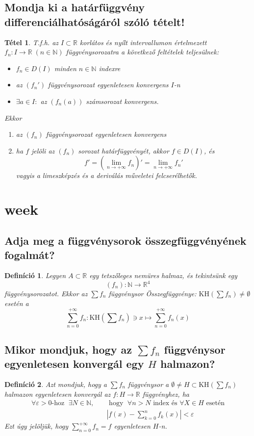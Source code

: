 \documentclass[12pt,a4paper]{article}
\newcommand{\R}{\mathbb{R}}
\newcommand{\N}{\mathbb{N}}
\newcommand{\fn}{f_n}
\newcommand{\KH}[1]{\text{KH}(#1)}
\newcommand{\bb}[1]{\left( #1 \right)}
\newcommand{\abs}[1]{\left| #1 \right|}
\newtheorem{tet}{Tétel}[section]
\newtheorem{defi}{Definíció}[section]
\begin{document}
\subsection{Mondja ki a határfüggvény differenciálhatóságáról szóló tételt!}
\begin{tet}
T.f.h. az $I \subset \R$ korlátos és nyílt intervallumon értelmezett $\fn : I \to \R \; \bb{n\in \N}$ függvénysorozatra a következő feltételek teljesülnek:
\begin{itemize}
\item $\fn \in D\bb{I}$ minden $n \in \N$ indexre
\item az $\bb{\fn'}$ függvénysorozat egyenletesen konvergens $I$-n
\item $\exists a \in I:$ az $\bb{\fn(a)}$ számsorozat konvergens.
\end{itemize}
Ekkor
\begin{enumerate}
\item az $\bb{\fn}$ függvénysorozat egyenletesen konvergens
\item ha $f$ jelöli az $\bb{\fn}$ sorozat határfüggvényét, akkor $f \in D(I)$, és
\[
f' = \bb{\lim\limits_{n \to +\infty}\fn}' = \lim\limits_{n \to +\infty} \fn'
\]
vagyis a limeszképzés és a deriválás műveletei felcserélhetők.
\end{enumerate}
\end{tet}
\newpage
\section{week}
\subsection{Adja meg a függvénysorok összegfüggvényének fogalmát?}
\begin{defi}
Legyen $A \subset \R $ egy tetszőleges nemüres halmaz, és tekintsünk egy
\[
\bb{\fn} : \N \to \R^4
\]
függvénysorozatot.
Ekkor az $\sum \fn$ függvénysor Összegfüggvénye: $\KH{\sum \fn} \neq \emptyset$ esetén a
\[
\sum\limits_{n=0}^{+ \infty} \fn : \KH{\sum\fn} \ni x \mapsto \sum\limits_{n=0}^{+ \infty} \fn(x)
\]
\end{defi}
\subsection{Mikor mondjuk, hogy az $\sum \fn$ függvénysor egyenletesen konvergál egy $H$ halmazon?}
\begin{defi}
Azt mondjuk, hogy a $\sum \fn$ függvénysor a $\emptyset \neq H \subset \KH{ \sum\fn }$ halmazon egyenletesen konvergál az $f : H\to \R$ függvényhez, ha
\begin{align*}
\forall \varepsilon > 0\text{-hoz }\; \exists N \in \N, \quad &\text{ hogy }\; \forall n >N \text{ index és } \forall X \in H \text{ esetén} \\
&\abs{f(x) - \sum\limits_{k=0}^n f_k(x)} < \varepsilon
\end{align*}
Ezt úgy jelöljük, hogy $\sum\limits_{n=0}^{+\infty}\fn = f$ egyenletesen $H$-n. 
\end{defi}
\end{document}
